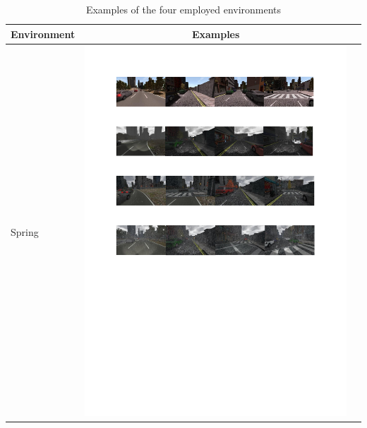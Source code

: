 \documentclass{svproc}
\begin{document}
\begin{table}[!t]
	\centering
	\caption{Examples of the four employed environments}
	\label{Table:Environments_Examples}
	\begin{tabular}{|C{1.5cm}|c|C{8.5cm}|}
		\hline
	\textbf{Environment} & \textbf{Examples} \\ \hline
	Spring & \begin{minipage}{.9\textwidth}\includegraphics[scale=.5,trim=2cm 24.5cm 2cm 2.5cm,clip]{examples.pdf}\end{minipage} \\ \hline

\end{tabular}
\end{table}
\end{document}
